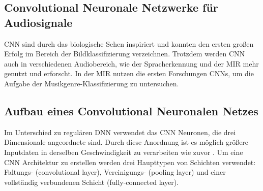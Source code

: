 \documentclass[twosided,a4,10pt]{article}
\begin{document}
\begin{multicols}{2}
		\section{Convolutional Neuronale Netzwerke für Audiosignale}
		CNN sind durch das biologische Sehen inspiriert und konnten den ersten großen Erfolg im Bereich der Bildklassifizierung \cite{alex} verzeichnen. Trotzdem werden CNN auch in verschiedenen Audiobereich, wie der Spracherkennung \cite{graves} und der MIR mehr genutzt und erforscht.\newline
		In der MIR nutzen die ersten Forschungen CNNs, um die Aufgabe der Musikgenre-Klassifizierung \cite{lee} zu untersuchen.
		
		
		\subsection{Aufbau eines Convolutional Neuronalen Netzes}
		Im Unterschied zu regulären DNN verwendet das CNN Neuronen, die drei Dimensionale angeordnete sind. Durch diese Anordnung ist es möglich größere Inputdaten in derselben Geschwindigkeit zu verarbeiten wie zuvor \cite{karpathy}. Um eine CNN Architektur zu erstellen werden drei Haupttypen von Schichten verwendet: Faltungs- (convolutional layer), Vereinigungs- (pooling layer) und einer vollständig verbundenen Schicht (fully-connected layer).
		

\end{multicols}
\end{document}
